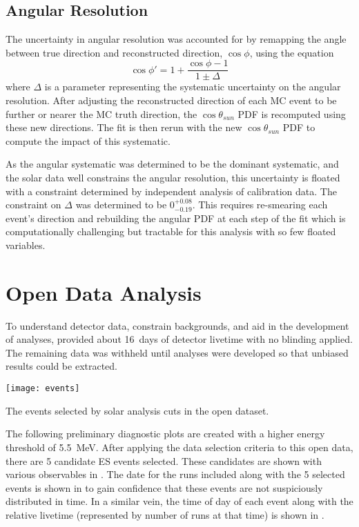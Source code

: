 \subsection{Angular Resolution}

The uncertainty in angular resolution was accounted for by remapping the angle between true direction and reconstructed direction, $\cos{\phi}$, using the equation
\begin{equation}
\cos{\phi'} = 1 + \frac{\cos{\phi}-1}{1\pm\Delta}
\label{solar:eq:dirres}
\end{equation}
where $\Delta$ is a parameter representing the systematic uncertainty on the angular resolution.
After adjusting the reconstructed direction of each MC event to be further or nearer the MC truth direction, the $\cos \theta_{sun}$ PDF is recomputed using these new directions.
The fit is then rerun with the new $\cos \theta_{sun}$ PDF to compute the impact of this systematic.

As the angular systematic was determined to be the dominant systematic, and the solar data well constrains the angular resolution, this uncertainty is floated with a constraint determined by independent analysis of \N calibration data.
The constraint on $\Delta$ was determined to be $0^{+0.08}_{-0.19}$.
This requires re-smearing each event's direction and rebuilding the angular PDF at each step of the fit which is computationally challenging but tractable for this analysis with so few floated variables.

\section{Open Data Analysis}
\label{sec:solar:opendata}

To understand detector data, constrain backgrounds, and aid in the development of analyses, {\snop} provided about 16~days of detector livetime with no blinding applied.
The remaining data was withheld until analyses were developed so that unbiased results could be extracted.

\begin{table}
\centering
\texttt{[image: events]}
\caption{The events selected by solar analysis cuts in the open dataset.}
\label{tbl:solar:openev}
\end{table}

The following preliminary diagnostic plots are created with a higher energy threshold of 5.5~MeV.
After applying the data selection criteria to this open data, there are 5 candidate ES events selected.
These candidates are shown with various observables in .
The {\snop} date for the runs included along with the 5 selected events is shown in  to gain confidence that these events are not suspiciously distributed in time.
In a similar vein, the time of day of each event along with the relative livetime (represented by number of runs at that time) is shown in .

